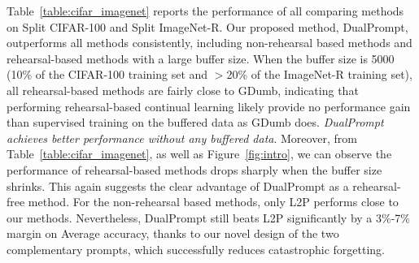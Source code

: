 \documentclass[runningheads]{llncs}
\newcommand{\method}{DualPrompt\xspace}
\begin{document}
Table~\ref{table:cifar_imagenet} reports the performance of all comparing methods on Split CIFAR-100 and Split ImageNet-R. Our proposed method, \method, outperforms all methods consistently, including non-rehearsal based methods and rehearsal-based methods with a large buffer size. 
When the buffer size is 5000 (10\% of the CIFAR-100 training set and $>$20\% of the ImageNet-R training set), all rehearsal-based methods are fairly close to GDumb, indicating that performing rehearsal-based continual learning likely provide no performance gain than supervised training on the buffered data as GDumb does. \textit{\method achieves better performance without any buffered data}. 
Moreover, from Table~\ref{table:cifar_imagenet}, as well as Figure~\ref{fig:intro}, we can observe the performance of rehearsal-based methods drops sharply when the buffer size shrinks. This again suggests the clear advantage of \method as a rehearsal-free method. For the non-rehearsal based methods, only L2P performs close to our methods. Nevertheless, \method still beats L2P significantly by a 3\%-7\% margin on Average accuracy, thanks to our novel design of the two complementary prompts, which successfully reduces catastrophic forgetting.
\end{document}
